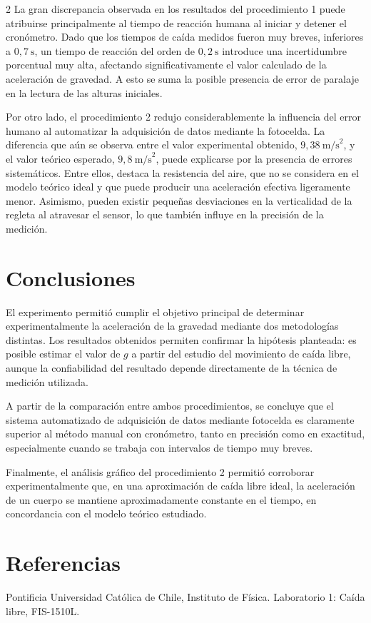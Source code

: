 \documentclass[11pt,letterpaper]{article}
\begin{document}
\begin{multicols}{2}
La gran discrepancia observada en los resultados del procedimiento 1 puede atribuirse principalmente al tiempo de reacción humana al iniciar y detener el cronómetro. Dado que los tiempos de caída medidos fueron muy breves, inferiores a $0,7\ \text{s}$, un tiempo de reacción del orden de $0,2\ \text{s}$ introduce una incertidumbre porcentual muy alta, afectando significativamente el valor calculado de la aceleración de gravedad. A esto se suma la posible presencia de error de paralaje en la lectura de las alturas iniciales.

Por otro lado, el procedimiento 2 redujo considerablemente la influencia del error humano al automatizar la adquisición de datos mediante la fotocelda. La diferencia que aún se observa entre el valor experimental obtenido, $9,38\ \text{m/s}^2$, y el valor teórico esperado, $9,8\ \text{m/s}^2$, puede explicarse por la presencia de errores sistemáticos. Entre ellos, destaca la resistencia del aire, que no se considera en el modelo teórico ideal y que puede producir una aceleración efectiva ligeramente menor. Asimismo, pueden existir pequeñas desviaciones en la verticalidad de la regleta al atravesar el sensor, lo que también influye en la precisión de la medición.

\section{Conclusiones}

El experimento permitió cumplir el objetivo principal de determinar experimentalmente la aceleración de la gravedad mediante dos metodologías distintas. Los resultados obtenidos permiten confirmar la hipótesis planteada: es posible estimar el valor de $g$ a partir del estudio del movimiento de caída libre, aunque la confiabilidad del resultado depende directamente de la técnica de medición utilizada.

A partir de la comparación entre ambos procedimientos, se concluye que el sistema automatizado de adquisición de datos mediante fotocelda es claramente superior al método manual con cronómetro, tanto en precisión como en exactitud, especialmente cuando se trabaja con intervalos de tiempo muy breves.

Finalmente, el análisis gráfico del procedimiento 2 permitió corroborar experimentalmente que, en una aproximación de caída libre ideal, la aceleración de un cuerpo se mantiene aproximadamente constante en el tiempo, en concordancia con el modelo teórico estudiado.

\end{multicols}

\section*{Referencias}

\noindent [1] Pontificia Universidad Católica de Chile, Instituto de Física. Laboratorio 1: Caída libre, FIS-1510L.
\end{document}
